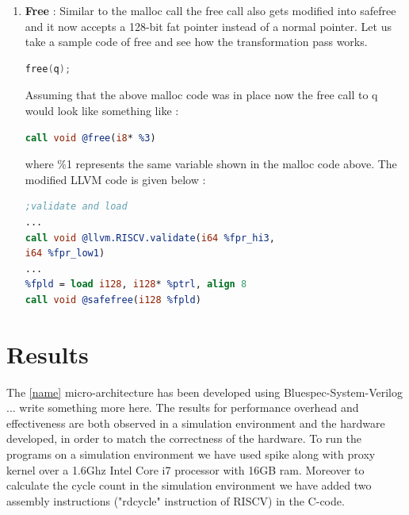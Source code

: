 \begin{enumerate}
\begin{lstlisting}[language=LLVM]
     \end{lstlisting}
     
    \item \textbf{Free} : Similar to the malloc call the free call also gets modified into safefree and it now accepts a 128-bit fat pointer instead of a normal pointer. Let us take a sample code of free and see how the transformation pass works.
    \begin{lstlisting}[language=C]
free(q);
     \end{lstlisting}
     
     Assuming that the above malloc code was in place now the free call to q would look like something like :
     \begin{lstlisting}[language=LLVM]
%3 = load i8*, i8** %1, align 8
call void @free(i8* %3)
     \end{lstlisting}
    where \%1 represents the same variable shown in the malloc code above. The modified LLVM code is given below : 
    \begin{lstlisting}[language=LLVM]
;validate and load
...
call void @llvm.RISCV.validate(i64 %fpr_hi3,
i64 %fpr_low1)
...
%fpld = load i128, i128* %ptrl, align 8
call void @safefree(i128 %fpld)

     \end{lstlisting}
\end{enumerate}

\section{Results}
The \ref{name} micro-architecture has been developed using Bluespec-System-Verilog ... write something more here. The results for performance overhead and effectiveness are both observed in a simulation environment and the hardware developed, in order to match the correctness of the hardware. To run the programs on a simulation environment we have used spike along with proxy kernel over a 1.6Ghz Intel Core i7 processor with 16GB ram. Moreover to calculate the cycle count in the simulation environment we have added two assembly instructions ("rdcycle" instruction of RISCV) in the C-code.


